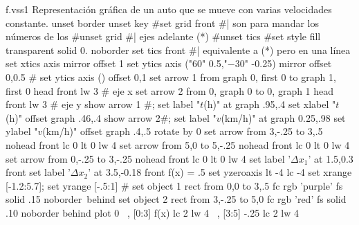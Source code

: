 \begin{plot}{.9}{f.vss1}
  {Representación gráfica de un auto que se mueve con varias velocidades
  constante.
  }
  unset border
  unset key
  #set grid front   #| son para mandar los números de los
  #unset grid	    #| ejes adelante (*)
  #unset tics
  #set style fill transparent solid 0. noborder
  set tics front    #| equivalente a (*) pero en una línea
  set xtics axis mirror offset 1
  set ytics axis ("$60$" 0.5,"$-30$" -0.25) mirror offset 0,0.5
  #  set ytics axis () offset 0,1
  set arrow 1 from graph 0, first 0 to graph 1, first 0 head front lw 3 # eje x
  set arrow 2 from 0, graph 0 to 0, graph 1 head front lw 3		# eje y 
  show arrow 1 #; set label "$t$(h)" at graph .95,.4
  set xlabel "$t$(h)" offset  graph .46,.4
  show arrow 2#; set label "$v$(km/h)" at graph 0.25,.98 
  set ylabel "$v$(km/h)" offset graph .4,.5 rotate by 0
  set arrow from 3,-.25 to 3,.5 nohead front lc 0 lt 0 lw 4
  set arrow from 5,0 to 5,-.25 nohead front lc 0 lt 0 lw 4
  set arrow from 0,-.25 to 3,-.25 nohead front lc 0 lt 0 lw 4
  set label '$\Delta x_1$' at 1.5,0.3 front
  set label '$\Delta x_2$' at 3.5,-0.18 front
  f(x) = .5
  set yzeroaxis lt -4 lc -4
  set xrange [-1.2:5.7]; set yrange [-.5:1]
  #
  set object 1 rect from 0,0 to 3,.5 fc rgb 'purple' fs solid .15 noborder\
  behind
  set object 2 rect from 3,-.25 to 5,0 fc rgb 'red' fs solid .10 noborder behind
  plot 0 \
  , [0:3] f(x) lc 2 lw 4 \
  , [3:5] -.25 lc 2 lw 4 \
\end{plot}

